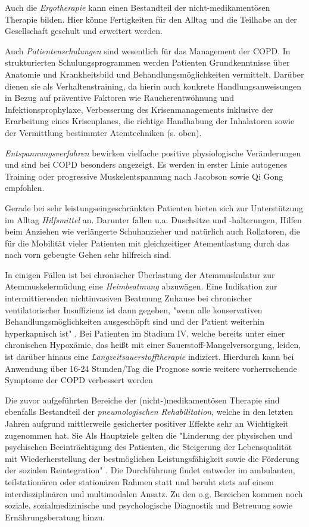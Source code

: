 Auch die \emph{Ergotherapie} kann einen Bestandteil der nicht-medikamentösen Therapie bilden. Hier könne Fertigkeiten für den Alltag und die Teilhabe an der Gesellschaft geschult und erweitert werden.

Auch \emph{Patientenschulungen} sind wesentlich für das Management der COPD. 
In strukturierten Schulungsprogrammen werden Patienten Grundkenntnisse über Anatomie und Krankheitsbild und Behandlungsmöglichkeiten vermittelt. Darüber dienen sie als Verhaltenstraining, da hierin auch konkrete Handlungsanweisungen in Bezug auf präventive Faktoren wie Raucherentwöhnung und Infektionsprophylaxe, Verbesserung des Krisenmanagements inklusive der Erarbeitung eines Krisenplanes, die richtige Handhabung der Inhalatoren sowie der Vermittlung bestimmter Atemtechniken (s. oben).

\emph{Entspannungsverfahren} bewirken vielfache positive physiologische Veränderungen und sind bei COPD besonders angezeigt. Es werden in erster Linie autogenes Training oder progressive Muskelentspannung nach Jacobson sowie Qi Gong empfohlen.

Gerade bei sehr leistungseingeschränkten Patienten bieten sich zur Unterstützung im Alltag \emph{Hilfsmittel} an. Darunter fallen u.a. Duschsitze und -halterungen, Hilfen beim Anziehen wie verlängerte Schuhanzieher und natürlich auch Rollatoren, die für die Mobilität vieler Patienten mit gleichzeitiger Atementlastung durch das nach vorn gebeugte Gehen sehr hilfreich sind.

In einigen Fällen ist bei chronischer Überlastung der Atemmuskulatur zur Atemmuskelermüdung eine \emph{Heimbeatmung} abzuwägen. Eine Indikation zur intermittierenden nichtinvasiven Beatmung Zuhause bei chronischer ventilatorischer Insuffizienz ist dann gegeben, "wenn alle konservativen Behandlungsmöglichkeiten ausgeschöpft sind und der Patient weiterhin hyperkapnisch ist" \autocite[e22]{vogelmeier2007}. Bei Patienten im Stadium IV, welche bereits unter einer chronischen Hypoxämie, das heißt mit einer Sauerstoff-Mangelversorgung, leiden, ist darüber hinaus eine \emph{Langzeitsauerstofftherapie} indiziert. Hierdurch kann bei Anwendung über 16-24 Stunden/Tag die Prognose sowie weitere vorherrschende Symptome der COPD verbessert werden \autocite[vgl.][e22]{vogelmeier2007}

Die zuvor aufgeführten Bereiche der (nicht-)medikamentösen Therapie sind ebenfalls Bestandteil der \emph{pneumologischen Rehabilitation}, welche in den letzten Jahren aufgrund mittlerweile gesicherter positiver Effekte sehr an Wichtigkeit zugenommen hat. Sie  Als Hauptziele gelten die "Linderung der physischen und psychischen Beeinträchtigung des Patienten, die Steigerung der Lebensqualität mit Wiederherstellung der bestmöglichen Leistungsfähigkeit sowie die Förderung der sozialen Reintegration" \autocite[e21]{vogelmeier2007}. Die Durchführung findet entweder im ambulanten, teilstationären oder stationären Rahmen statt und beruht stets auf einem interdisziplinären und multimodalen Ansatz. Zu den o.g. Bereichen kommen noch soziale, sozialmedizinische und psychologische Diagnostik und Betreuung sowie Ernährungsberatung hinzu. 

